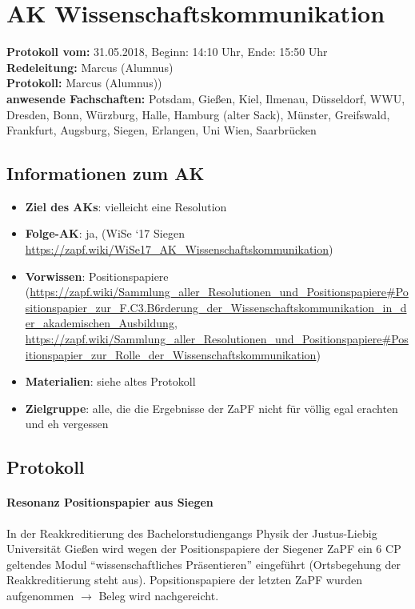 
\section{AK Wissenschaftskommunikation}

	\textbf{Protokoll vom:} 31.05.2018, %
	Beginn: 14:10 Uhr,
	Ende: 15:50 Uhr \\
	\textbf{Redeleitung:} Marcus (Alumnus) \\
	\textbf{Protokoll:} Marcus (Alumnus)) \\
	\textbf{anwesende Fachschaften:} Potsdam, Gießen, Kiel, Ilmenau, Düsseldorf, WWU, Dresden, Bonn, Würzburg, Halle, Hamburg (alter Sack), Münster, Greifswald, Frankfurt, Augsburg, Siegen, Erlangen, Uni Wien, Saarbrücken

	\subsection*{Informationen zum AK}
		\begin{itemize}
			\item \textbf{Ziel des AKs}: vielleicht eine Resolution
			\item \textbf{Folge-AK}: ja, (WiSe `17 Siegen \url{https://zapf.wiki/WiSe17_AK_Wissenschaftskommunikation})
			\item \textbf{Vorwissen}: Positionspapiere (\url{https://zapf.wiki/Sammlung_aller_Resolutionen_und_Positionspapiere#Positionspapier_zur_F.C3.B6rderung_der_Wissenschaftskommunikation_in_der_akademischen_Ausbildung}, \url{https://zapf.wiki/Sammlung_aller_Resolutionen_und_Positionspapiere#Positionspapier_zur_Rolle_der_Wissenschaftskommunikation})
      \item \textbf{Materialien}: siehe altes Protokoll
			\item \textbf{Zielgruppe}: alle, die die Ergebnisse der ZaPF nicht für völlig egal erachten und eh vergessen
		\end{itemize}

  \subsection*{Protokoll}
    \paragraph{Resonanz Positionspapier aus Siegen}
      In der Reakkreditierung des Bachelorstudiengangs Physik der Justus-Liebig Universität Gießen wird wegen der Positionspapiere
      der Siegener ZaPF ein 6 CP geltendes Modul ``wissenschaftliches Präsentieren'' eingeführt (Ortsbegehung der Reakkreditierung steht aus).
      Popsitionspapiere der letzten ZaPF wurden aufgenommen $\rightarrow$ Beleg wird nachgereicht.

